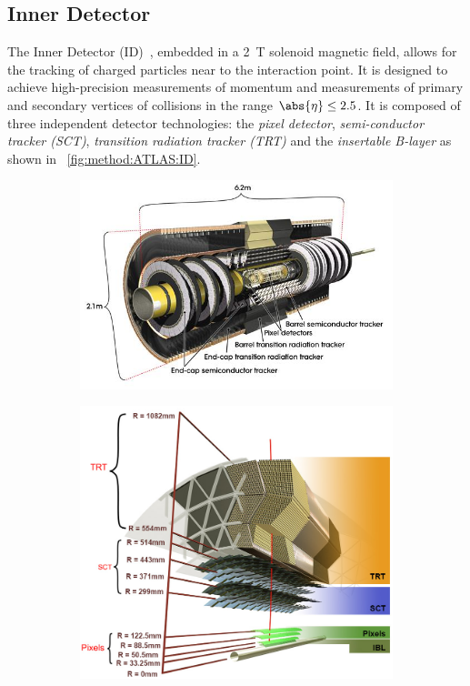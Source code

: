 \subsection{Inner Detector}\label{sec:method:ID}
The Inner Detector (ID)~\cite{ATLAS:ID-TDR}, embedded in a \SI{2}{\tesla} solenoid magnetic field, allows for the tracking of charged particles near to the interaction point. It is designed to achieve high-precision measurements of momentum and measurements of primary and secondary vertices of collisions in the range $\abs{\eta} \leq 2.5$. It is composed of three independent detector technologies: the \emph{pixel detector}, \emph{semi-conductor tracker (SCT)}, \emph{transition radiation tracker (TRT)} and the \emph{insertable B-layer} as shown in ~\cref{fig:method:ATLAS:ID}. 
\begin{figure}[!htpb]
    \centering
    \begin{subfigure}[b]{0.49\textwidth}
        \centering
        \includegraphics[width=\textwidth]{images/ATLAS_ID_no_IBL}
        \label{fig:limit_lambda1}
    \end{subfigure}
    \begin{subfigure}[b]{0.49\textwidth}
        \centering
        \includegraphics[width=\textwidth]{images/ID_withIBL}

\end{subfigure}
\end{figure}
